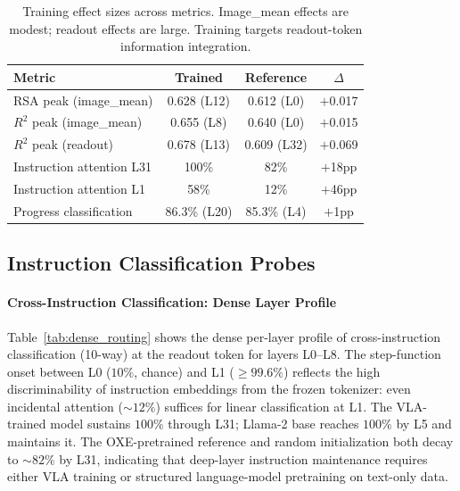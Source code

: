 \begin{table}[h]
\centering
\caption{Training effect sizes across metrics. Image\_mean effects are modest; readout effects are large. Training targets readout-token information integration.}
\label{tab:training_effect_summary}
\small
\begin{tabular}{lccc}
\toprule
\textbf{Metric} & \textbf{Trained} & \textbf{Reference} & \textbf{$\Delta$} \\
\midrule
RSA peak (image\_mean) & 0.628 (L12) & 0.612 (L0) & $+$0.017 \\
$R^2$ peak (image\_mean) & 0.655 (L8) & 0.640 (L0) & $+$0.015 \\
$R^2$ peak (readout) & 0.678 (L13) & 0.609 (L32) & $+$0.069 \\
Instruction attention L31 & 100\% & 82\% & $+$18pp \\
Instruction attention L1 & 58\% & 12\% & $+$46pp \\
Progress classification & 86.3\% (L20) & 85.3\% (L4) & $+$1pp \\
\bottomrule
\end{tabular}
\end{table}

\subsection{Instruction Classification Probes}
\paragraph{Cross-Instruction Classification: Dense Layer Profile}
\label{sec:dense_routing}

Table~\ref{tab:dense_routing} shows the dense per-layer profile of cross-instruction classification (10-way) at the readout token for layers L0--L8.
The step-function onset between L0 ($10\%$, chance) and L1 (${\geq}99.6\%$) reflects the high discriminability of instruction embeddings from the frozen tokenizer: even incidental attention (${\sim}12\%$) suffices for linear classification at L1.
The VLA-trained model sustains $100\%$ through L31; Llama-2 base reaches $100\%$ by L5 and maintains it. The OXE-pretrained reference and random initialization both decay to ${\sim}82\%$ by L31, indicating that deep-layer instruction maintenance requires either VLA training or structured language-model pretraining on text-only data.

